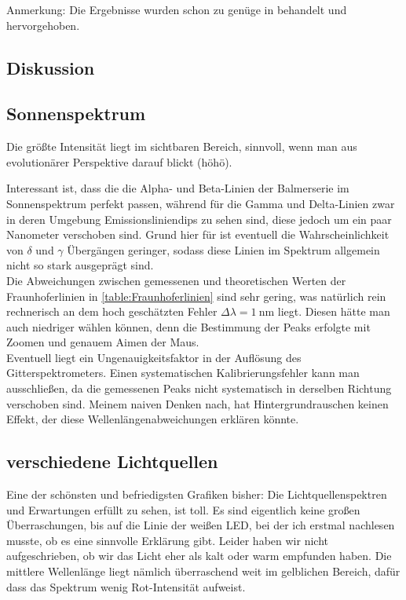 Anmerkung: Die Ergebnisse wurden schon zu genüge in  behandelt und hervorgehoben.
\subsection{Diskussion}
\subsection*{Sonnenspektrum}
Die größte Intensität liegt im sichtbaren Bereich, sinnvoll, wenn man aus evolutionärer Perspektive darauf blickt (höhö).\par
Interessant ist, dass die die Alpha- und Beta-Linien der Balmerserie im Sonnenspektrum perfekt passen, während für die Gamma und
Delta-Linien zwar in deren Umgebung Emissionsliniendips zu sehen sind, diese jedoch um ein paar Nanometer
verschoben sind. Grund hier für ist eventuell die Wahrscheinlichkeit von \(\delta\) 
und \(\gamma\) Übergängen geringer, sodass diese Linien im Spektrum allgemein nicht so stark ausgeprägt sind.\\
Die Abweichungen zwischen gemessenen und theoretischen Werten der Fraunhoferlinien in \cref{table:Fraunhoferlinien} sind sehr gering, was natürlich rein rechnerisch an dem hoch geschätzten Fehler \(\Delta \lambda=\qty{1}{\nano\m}\) liegt. 
Diesen hätte man auch niedriger wählen können, denn die Bestimmung der Peaks erfolgte mit Zoomen und genauem Aimen der Maus.  \\
Eventuell liegt ein Ungenauigkeitsfaktor in der Auflösung des Gitterspektrometers. Einen systematischen Kalibrierungsfehler kann man ausschließen, da die gemessenen Peaks nicht systematisch in derselben Richtung verschoben sind. Meinem naiven Denken nach, hat Hintergrundrauschen keinen Effekt, der diese Wellenlängenabweichungen erklären könnte.

\subsection*{verschiedene Lichtquellen}
Eine der schönsten und befriedigsten Grafiken bisher: Die Lichtquellenspektren und Erwartungen erfüllt zu sehen, ist toll. Es sind eigentlich keine großen Überraschungen, bis auf die Linie der weißen LED, bei der ich erstmal nachlesen musste, ob es eine sinnvolle Erklärung gibt. Leider haben wir nicht aufgeschrieben, ob wir das Licht eher als kalt oder warm empfunden haben. Die mittlere Wellenlänge liegt nämlich überraschend weit im gelblichen Bereich, dafür dass das Spektrum wenig Rot-Intensität aufweist. 

